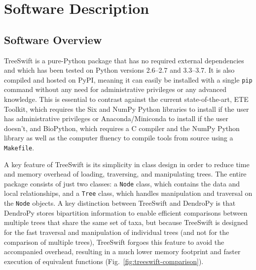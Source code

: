 \section{Software Description}\label{sec:treeswift-description}
\subsection{Software Overview}\label{sec:treeswift-overview}
TreeSwift is a pure-Python package that has no required external dependencies and which has been tested on Python versions 2.6--2.7 and 3.3--3.7. It is also compiled and hosted on PyPI, meaning it can easily be installed with a single \texttt{pip} command without any need for administrative privileges or any advanced knowledge. This is essential to contrast against the current state-of-the-art, ETE Toolkit, which requires the Six and NumPy Python libraries to install if the user has administrative privileges or Anaconda/Miniconda to install if the user doesn't, and BioPython, which requires a C compiler and the NumPy Python library as well as the computer fluency to compile tools from source using a \texttt{Makefile}.

A key feature of TreeSwift is its simplicity in class design in order to reduce time and memory overhead of loading, traversing, and manipulating trees. The entire package consists of just two classes: a \texttt{Node} class, which contains the data and local relationships, and a \texttt{Tree} class, which handles manipulation and traversal on the \texttt{Node} objects. A key distinction between TreeSwift and DendroPy is that DendroPy stores bipartition information to enable efficient comparisons between multiple trees that share the same set of taxa, but because TreeSwift is designed for the fast traversal and manipulation of individual trees (and not for the comparison of multiple trees), TreeSwift forgoes this feature to avoid the accompanied overhead, resulting in a much lower memory footprint and faster execution of equivalent functions (Fig.~\ref{fig:treeswift-comparison}).

